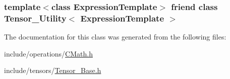 \subsubsection[{\texorpdfstring{Tensor\+\_\+\+Utility$<$ Expression\+Template $>$}{Tensor_Utility< ExpressionTemplate >}}]{\setlength{\rightskip}{0pt plus 5cm}template$<$class Expression\+Template$>$ friend class {\bf Tensor\+\_\+\+Utility}$<$ Expression\+Template $>$\hspace{0.3cm}{\ttfamily [friend]}}\hypertarget{classBC_1_1tensors_1_1Tensor__Base_aaa8ea88f77d460ba935be4e28eac3b41}{}\label{classBC_1_1tensors_1_1Tensor__Base_aaa8ea88f77d460ba935be4e28eac3b41}


The documentation for this class was generated from the following files\+:\begin{DoxyCompactItemize}
\item 
include/operations/\hyperlink{CMath_8h}{C\+Math.\+h}\item 
include/tensors/\hyperlink{Tensor__Base_8h}{Tensor\+\_\+\+Base.\+h}\end{DoxyCompactItemize}
